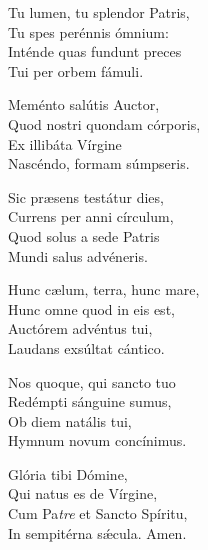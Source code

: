 Tu lumen, tu splendor Patris,\\
Tu spes perénnis ómnium:\\
Inténde quas fundunt preces\\
Tui per orbem fámuli.

Meménto salútis Auctor,\\
Quod nostri quondam córporis,\\
Ex illibáta Vírgine\\
Nascéndo, formam súmpseris.

Sic præsens testátur dies,\\
Currens per anni círculum,\\
Quod solus a sede Patris\\
Mundi salus advéneris.

Hunc cælum, terra, hunc mare,\\
Hunc omne quod in eis est,\\
Auctórem advéntus tui,\\
Laudans exsúltat cántico.

Nos quoque, qui sancto tuo\\
Redémpti sánguine sumus,\\
Ob diem natális tui,\\
Hymnum novum concínimus.

Glória tibi Dómine,\\
Qui natus es de Vírgine,\\
Cum Pa\tinyhspace\textit{tre} et Sancto Spíritu,\\
In sempitérna sǽcula.
Amen.